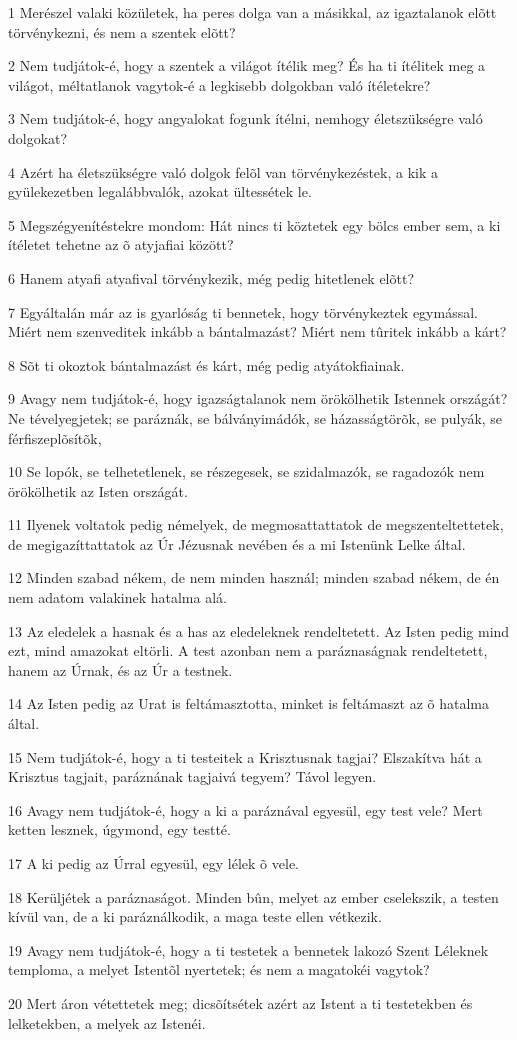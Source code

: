 \par 1 Merészel valaki közületek, ha peres dolga van a másikkal, az igaztalanok elõtt törvénykezni, és nem a szentek elõtt?
\par 2 Nem tudjátok-é, hogy a szentek a világot ítélik meg? És ha ti ítélitek meg a világot, méltatlanok vagytok-é a legkisebb dolgokban való ítéletekre?
\par 3 Nem tudjátok-é, hogy angyalokat fogunk ítélni, nemhogy életszükségre való dolgokat?
\par 4 Azért ha életszükségre való dolgok felõl van törvénykezéstek, a kik a gyülekezetben legalábbvalók, azokat ültessétek le.
\par 5 Megszégyenítéstekre mondom: Hát nincs ti köztetek egy bölcs ember sem, a ki ítéletet tehetne az õ atyjafiai között?
\par 6 Hanem atyafi atyafival törvénykezik, még pedig hitetlenek elõtt?
\par 7 Egyáltalán már az is gyarlóság ti bennetek, hogy törvénykeztek egymással. Miért  nem szenveditek inkább a bántalmazást? Miért nem tûritek inkább a kárt?
\par 8 Sõt ti okoztok bántalmazást és kárt, még pedig atyátokfiainak.
\par 9 Avagy nem tudjátok-é, hogy igazságtalanok nem örökölhetik Istennek országát? Ne tévelyegjetek; se paráznák, se bálványimádók, se házasságtörõk, se pulyák, se férfiszeplõsítõk,
\par 10 Se lopók, se telhetetlenek, se részegesek, se szidalmazók, se ragadozók nem örökölhetik az Isten országát.
\par 11 Ilyenek voltatok pedig némelyek, de megmosattattatok  de megszenteltettetek, de megigazíttattatok az Úr Jézusnak nevében és a mi Istenünk Lelke által.
\par 12 Minden szabad nékem, de nem minden használ; minden szabad nékem, de én nem adatom valakinek hatalma alá.
\par 13 Az eledelek a hasnak és a has az eledeleknek rendeltetett. Az Isten pedig mind ezt, mind amazokat eltörli. A test azonban nem a paráznaságnak  rendeltetett, hanem az Úrnak, és az Úr a testnek.
\par 14 Az Isten pedig az Urat is feltámasztotta, minket is feltámaszt az õ hatalma által.
\par 15 Nem tudjátok-é, hogy a ti testeitek a Krisztusnak tagjai? Elszakítva hát a Krisztus tagjait, paráznának tagjaivá tegyem? Távol legyen.
\par 16 Avagy nem tudjátok-é, hogy a ki a paráznával egyesül, egy test vele? Mert ketten lesznek, úgymond, egy testté.
\par 17 A ki pedig az Úrral egyesül, egy lélek õ vele.
\par 18 Kerüljétek a paráznaságot. Minden bûn, melyet az ember cselekszik, a testen kívül van, de a ki paráználkodik, a maga teste ellen vétkezik.
\par 19 Avagy nem tudjátok-é, hogy a ti testetek a bennetek lakozó Szent Léleknek temploma, a melyet Istentõl nyertetek; és nem a magatokéi  vagytok?
\par 20 Mert áron vétettetek meg; dicsõítsétek  azért az Istent a ti testetekben és lelketekben, a melyek az Istenéi.

